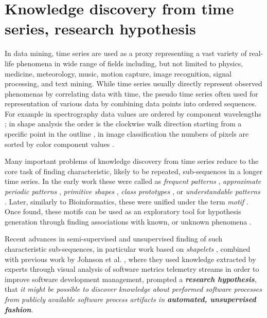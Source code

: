 \section{Knowledge discovery from time series, research hypothesis}\label{knowledge_discovery}
In data mining, time series are used as a proxy representing a vast variety of real-life phenomena 
in wide range of fields including, but not limited to physics, medicine, meteorology, 
music, motion capture, image recognition, signal processing, and text mining. 
While time series usually directly represent observed phenomenas by correlating data with time, the pseudo 
time series often used for representation of various data by combining data points into ordered sequences. 
For example in spectrography data values are ordered by component wavelengths \cite{citeulike:12550833};
in shape analysis the order is the clockwise walk direction starting from a
specific point in the outline \cite{citeulike:12550835}, in image classification the numbers of pixels
are sorted by color component values \cite{citeulike:2900542}.

Many important problems of knowledge discovery from time series reduce to the core task of finding 
characteristic, likely to be repeated, sub-sequences in a longer time series. 
In the early work these were called as 
\textit{frequent patterns} \cite{citeulike:5159615}, 
\textit{approximate periodic patterns} \cite{citeulike:1959582},
\textit{primitive shapes} \cite{citeulike:5898869}, 
\textit{class prototypes} \cite{citeulike:4406444}, 
or \textit{understandable patterns} \cite{citeulike:3978076}. 
Later, similarly to Bioinformatics, these were unified under the term \textit{motif} \cite{citeulike:3977965}.
Once found, these motifs can be used as an exploratory tool for hypothesis generation through finding 
associations with known, or unknown phenomena \cite{citeulike:3977965}.

Recent advances in semi-supervised and unsupervised finding of such characteristic sub-sequences, 
in particular work based on \textit{shapelets} \cite{citeulike:7344347} \cite{citeulike:11957982}
\cite{citeulike:12552293}, combined with previous work by Johnson et al. \cite{citeulike:12550871}, 
where they used knowledge extracted by experts through visual analysis of software metrics 
telemetry streams in order to improve software development management, 
prompted a \textbf{\textit{research hypothesis}}, that \textit{it might be possible to discover 
knowledge about performed software processes from publicly available software process artifacts in 
\textbf{automated, unsupervised fashion}.}

